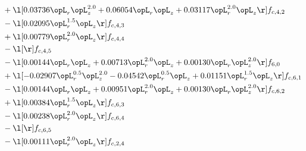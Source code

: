 \begin{alignat}{2}
& + \l[  0.03736 \opL_r \opL_z^{2.0} +  0.06054 \opL_r \opL_z +  0.03117 \opL_r^{2.0} \opL_z  \r] f_{c,4,2} \nonumber \\ 
& - \l[  0.02095 \opL_r^{1.5} \opL_z  \r] f_{c,4,3} \nonumber \\ 
& + \l[  0.00779 \opL_r^{2.0} \opL_z  \r] f_{c,4,4} \nonumber \\ 
& - \l[  \r] f_{c,4,5} \nonumber \\ 
& - \l[  0.00144 \opL_r \opL_z +  0.00713 \opL_r^{2.0} \opL_z +  0.00130 \opL_r \opL_z^{2.0}  \r] f_{6,0} \nonumber \\ 
& + \l[  -0.02907 \opL_r^{0.5} \opL_z^{2.0}   -0.04542 \opL_r^{0.5} \opL_z +  0.01151 \opL_r^{1.5} \opL_z  \r] f_{c,6,1} \nonumber \\ 
& - \l[  0.00144 \opL_r \opL_z +  0.00951 \opL_r^{2.0} \opL_z +  0.00130 \opL_r \opL_z^{2.0}  \r] f_{c,6,2} \nonumber \\ 
& + \l[  0.00384 \opL_r^{1.5} \opL_z  \r] f_{c,6,3} \nonumber \\ 
& - \l[  0.00238 \opL_r^{2.0} \opL_z  \r] f_{c,6,4} \nonumber \\ 
& - \l[  \r] f_{c,6,5} \nonumber \\ 
& - \l[  0.00111 \opL_r^{2.0} \opL_z  \r] f_{c,2,4} \nonumber \\ 
\end{alignat} 


